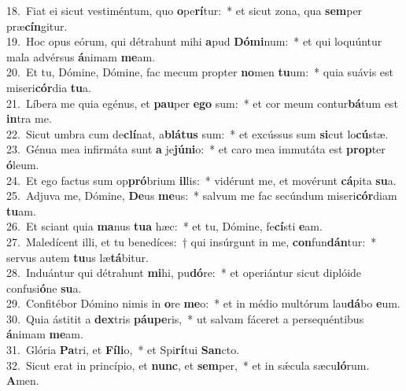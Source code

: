 {18.~}Fiat ei sicut vestiméntum, quo \textbf{o}pe\textbf{rí}tur:~* et sicut zona, qua \textbf{sem}per præ\textbf{cín}gitur.\\
{19.~}Hoc opus eórum, qui détrahunt mihi \textbf{a}pud \textbf{Dó}\textbf{mi}num:~* et qui loquúntur mala advérsus \textbf{á}nimam \textbf{me}am.\\
{20.~}Et tu, Dómine, Dómine, fac mecum propter \textbf{no}men \textbf{tu}um:~* quia suávis est miseri\textbf{cór}dia \textbf{tu}a.\\
{21.~}Líbera me quia egénus, et \textbf{pau}per \textbf{e}\textbf{go} sum:~* et cor meum contur\textbf{bá}tum est \textbf{in}tra me.\\
{22.~}Sicut umbra cum de\textbf{clí}nat, a\textbf{blá}\textbf{tus} sum:~* et excússus sum \textbf{si}cut lo\textbf{cú}stæ.\\
{23.~}Génua mea infirmáta sunt \textbf{a} je\textbf{jú}\textbf{ni}o:~* et caro mea immutáta est \textbf{prop}ter \textbf{ó}leum.\\
{24.~}Et ego factus sum op\textbf{pró}brium \textbf{il}lis:~* vidérunt me, et movérunt \textbf{cá}pita \textbf{su}a.\\
{25.~}Adjuva me, Dómine, \textbf{De}us \textbf{me}us:~* salvum me fac secúndum miseri\textbf{cór}diam \textbf{tu}am.\\
{26.~}Et sciant quia \textbf{ma}nus \textbf{tu}\textbf{a} hæc:~* et tu, Dómine, fe\textbf{cí}sti \textbf{e}am.\\
{27.~}Maledícent illi, et tu benedíces:~† qui insúrgunt in me, \textbf{con}fun\textbf{dán}tur:~* servus autem \textbf{tu}us læ\textbf{tá}bitur.\\
{28.~}Induántur qui détrahunt \textbf{mi}hi, pu\textbf{dó}re:~* et operiántur sicut diplóide confusi\textbf{ó}ne \textbf{su}a.\\
{29.~}Confitébor Dómino nimis in \textbf{o}re \textbf{me}o:~* et in médio multórum lau\textbf{dá}bo \textbf{e}um.\\
{30.~}Quia ástitit a \textbf{dex}tris \textbf{páu}\textbf{pe}ris,~* ut salvam fáceret a persequéntibus \textbf{á}nimam \textbf{me}am.\\
{31.~}Glória \textbf{Pa}tri, et \textbf{Fí}\textbf{li}o,~* et Spi\textbf{rí}tui \textbf{San}cto.\\
{32.~}Sicut erat in princípio, et \textbf{nunc}, et \textbf{sem}per,~* et in sǽcula sæcu\textbf{ló}rum. \textbf{A}men.\\
